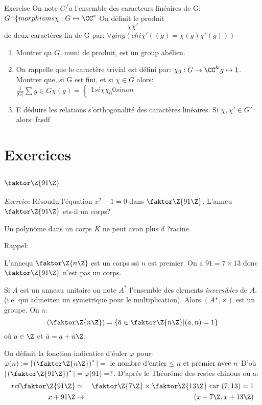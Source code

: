 Exercise On note $G^fa$ l'ensemble des caracteurs linéaires de G: $G^=\{morphisms \chi:G\mapsto \CC^*$ On définit le produit $$\chi\chi'$$ de deux caractères lin de G par: $\forall g in g (chi\chi'((g)=\chi(g)\chi'(g)))$

\begin{enumerate}
	\item Montrer qu $G$, muni de produit, est un group abélien.
	\item On rappelle que le caractère trivial est défini par: $\chi_0:G \rightarrow \CC^\& g\mapsto 1$.
	Montrer que, si G est fini, et si $\chi \in G$ alors:
	$\frac 1{|G|}\sum g\in G\chi(g)=\left\{\begin{array}{l} 1 si \chi\chi_0 0 sinon\end{array}\right. $
	\item E déduire les relations s'orthogonalité des caractères linéaires. Si $\chi,\chi'\in Gˆ$ alors: fasdf
\end{enumerate}


\chapter{Exercices}

\section{$\faktor\Z{91\Z}$}

\emph{Exercice}
Résoudu l'équation $x^2-1=0$ dans $\faktor\Z{91\Z}$. L'anneu $\faktor\Z{91\Z}$ ets-il un corps?
\begin{remark}
	Un polynôme dans un corps $K$ ne peut avon plus $d$ ?racine.
\end{remark}

Rappel:

L'annequ $\faktor\Z{n\Z}$ est un corps ssi $n$ est premier. On a $91=7\times 13$ donc $\faktor\Z{91\Z}$ n'est pas un corps.

Si $A$ est un anneau unitaire on note $A^{\ast}$ l'ensemble des elements \emph{inversibles} de $A$. (i.e. qui admetten un symetrique pour le multiplication). Alors $(A\ast,\times)$ est un groupe. On a:
$$(\faktor\Z{n\Z})=\{\bar a\in \faktor\Z{n\Z}|(a,n)=1\}$$ où $a\in\Z$ et $\bar a=a+n\Z$.

On définit la fonction indicatice d'éuler $\varphi $ pour: $\varphi (n):=|\left(\faktor\Z{n\Z}\right)^\ast|=\mbox{ le nombre d'entier $\leq n$ et premier avec $n$}$ D'où $|\left(\faktor\Z{91\Z}\right)^\ast|=\varphi (91)=?$. D'aprés le Théoréme des restes chinous ou a:
\begin{align}{rcl}
	\faktor\Z{91\Z} &\simeq& \faktor\Z{7\Z}\times \faktor\Z{13\Z}\text{ car } (7,13)=1\\
	x+91\Z &\mapsto& (x+7\Z,x+13\Z)
\end{align}

